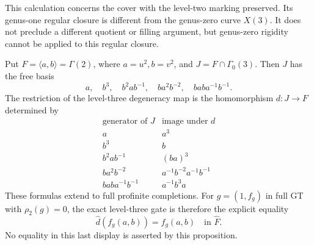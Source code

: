 This calculation concerns the cover with the level-two
marking preserved. Its genus-one regular closure is different
from the genus-zero curve \(X(3)\). It does not preclude a
different quotient or filling argument, but genus-zero
rigidity cannot be applied to this regular closure.

\begin{proposition}\label{prop:level3-free-subgroup}
Put \(F=\langle a,b\rangle=\Gamma(2)\), where \(a=u^2,b=v^2\),
and \(J=F\cap\Gamma_0(3)\). Then \(J\) has the free basis
\[
 a,\quad b^3,\quad b^2ab^{-1},\quad ba^2b^{-2},
       \quad baba^{-1}b^{-1}.
\]
The restriction of the level-three degeneracy map is the
homomorphism \(d:J\to F\) determined by
\[
\begin{array}{c|c}
 \text{generator of }J&\text{image under }d\\ \hline
 a&a^3\\
 b^3&b\\
 b^2ab^{-1}&(ba)^3\\
 ba^2b^{-2}&a^{-1}b^{-2}a^{-1}b^{-1}\\
 baba^{-1}b^{-1}&a^{-1}b^3a
\end{array}
\]
These formulas extend to full profinite completions. For
\(g=(1,f_g)\) in full GT with \(\rho_2(g)=0\), the exact
level-three gate is therefore the explicit equality
\[
             \widehat d(f_g(a,b))=f_g(a,b)
                       \quad\text{in }\widehat F.
\]
No equality in this last display is asserted by this proposition.
\end{proposition}
